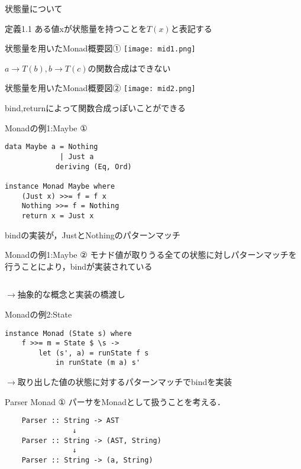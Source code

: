 \documentclass[uplatex,dvipdfmx,ja=standard]{beamer}
\begin{document}
\begin{frame}{状態量について}
    \begin{block}{定義1.1}
    ある値xが状態量を持つことを$T(x)$と表記する
    \end{block}
\end{frame}


\begin{frame}{状態量を用いたMonad概要図①}
    \centering 
    \texttt{[image: mid1.png]}

    $a \to T(b) , b \to T(c)$の関数合成はできない
\end{frame}

\begin{frame}{状態量を用いたMonad概要図②}
    \centering 
    \texttt{[image: mid2.png]}

    bind,returnによって関数合成っぽいことができる
\end{frame}

\begin{frame}[fragile]{Monadの例1:Maybe ①}
    \begin{verbatim}
data Maybe a = Nothing
             | Just a 
            deriving (Eq, Ord)
    
instance Monad Maybe where
    (Just x) >>= f = f x
    Nothing >>= f = Nothing
    return x = Just x
    \end{verbatim}
    bindの実装が，JustとNothingのパターンマッチ
\end{frame}

\begin{frame}[fragile]{Monadの例1:Maybe ②}
    モナド値が取りうる全ての状態に対しパターンマッチを行うことにより，bindが実装されている
    \begin{verbatim}

    \end{verbatim}
    $\to$抽象的な概念と実装の橋渡し
\end{frame}

\begin{frame}[fragile]{Monadの例2:State}
    \begin{verbatim}
instance Monad (State s) where
    f >>= m = State $ \s ->
        let (s', a) = runState f s
            in runState (m a) s'

    \end{verbatim}
    $\to$取り出した値の状態に対するパターンマッチでbindを実装
\end{frame}

\begin{frame}[fragile]{Parser Monad ①}
    パーサをMonadとして扱うことを考える．
    \begin{verbatim}
    Parser :: String -> AST
                ↓
    Parser :: String -> (AST, String)
                ↓
    Parser :: String -> (a, String)
    \end{verbatim}
\end{frame}
\end{document}
